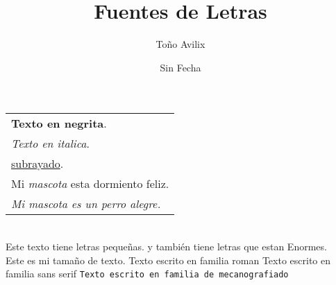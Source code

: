 \documentclass[letterpaper,11pt]{article}
\title{Fuentes de Letras}
\author{Toño Avilix}
\date{Sin Fecha}
\begin{document}
\maketitle
\maketitle
\begin{tabular}{l}
    \textbf{Texto en negrita}. \\
    \textit{Texto en italica}. \\ 
    \underline{subrayado}.\\
    Mi \emph{mascota} esta dormiento feliz.\\
    \textit{Mi mascota es un \emph{perro} alegre.}\\
\end{tabular}
\\Este texto tiene letras \tiny pequeñas. \normalsize y también
tiene letras que estan \huge{Enormes}.\\
\normalsize Este es mi tamaño de 
\fontsize{50}{60}\selectfont texto.
\normalsize
\textrm{Texto escrito en familia roman}
\textsf{Texto escrito en familia sans serif}
\texttt{Texto escrito en familia de mecanografiado}
\end{document}
